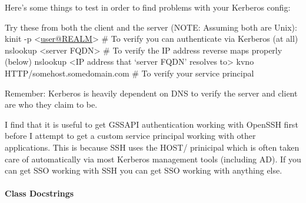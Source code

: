 \documentclass[letterpaper,10pt,openany]{sphinxmanual}
\begin{document}
Here's some things to test in order to find problems with your Kerberos config:

Try these from both the client and the server (NOTE: Assuming both are Unix):
kinit -p \textless{}\href{mailto:user@REALM}{user@REALM}\textgreater{} \# To verify you can authenticate via Kerberos (at all)
nslookup \textless{}server FQDN\textgreater{} \# To verify the IP address reverse maps properly (below)
nslookup \textless{}IP address that `server FQDN' resolves to\textgreater{}
kvno HTTP/somehost.somedomain.com \# To verify your service principal

Remember: Kerberos is heavily dependent on DNS to verify the server and client
are who they claim to be.

I find that it is useful to get GSSAPI authentication working with OpenSSH first
before I attempt to get a custom service principal working with other
applications.  This is because SSH uses the HOST/ prinicipal which is often
taken care of automatically via most Kerberos management tools (including AD).
If you can get SSO working with SSH you can get SSO working with anything else.


\paragraph{Class Docstrings}
\label{Developer/sso:class-docstrings}
\end{document}
